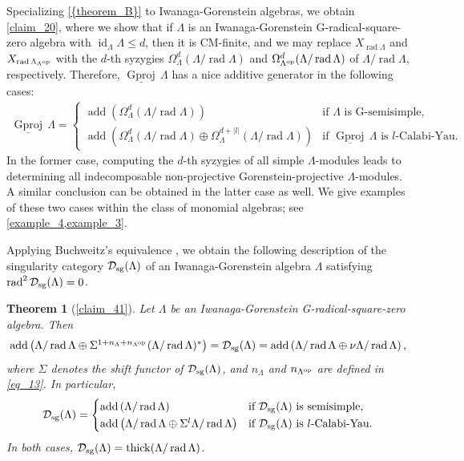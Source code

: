 \documentclass[12pt]{amsart}
\numberwithin{equation}{subsection}
\theoremstyle{plain}
\newtheorem{theorem}{Theorem}[section]
\theoremstyle{definition}
\newcommand{\rad}{\operatorname{rad}}
\newcommand{\add}{\operatorname{add}}
\newcommand{\sGproj}{\underline{\operatorname{Gproj}}\,}
\newcommand{\thick}{\operatorname{thick}}
\newcommand{\injdim}{\operatorname{id}}
\renewcommand{\L}{\Lambda}
\newcommand{\D}{\mathcal{D}}
\newcommand{\op}{{\rm op}}
\begin{document}
Specializing \cref{{theorem_B}} to Iwanaga-Gorenstein algebras, we obtain \cref{claim_20}, where we show that if $\L$ is an Iwanaga-Gorenstein G-radical-square-zero algebra with $\injdim_\L\L\leq d$, then it is CM-finite, and we may replace $X_{\rad\L}$ and $X_{\rad\L_{\L^\op}}$ with the $d$-th syzygies $\Omega_\L^d(\L/\rad\L)$ and $\Omega_{\L^\op}^d(\L/\rad\L)$ of $\L/\rad\L$, respectively.
Therefore, $\sGproj\L$ has a nice additive generator in the following cases:
\begin{align}
    \sGproj\L = 
    \begin{cases}
    \add\left(\Omega_\L^d(\L/\rad\L)\right) &\text{if $\L$ is G-semisimple,}\\[1.5mm]
    \add\left(\Omega_\L^d(\L/\rad\L)\oplus\Omega_\L^{d+|l|}(\L/\rad\L)\right) &\text{if $\sGproj\L$ is $l$-Calabi-Yau.}
    \end{cases}
\end{align}
In the former case, computing the $d$-th syzygies of all simple $\L$-modules leads to determining all indecomposable non-projective Gorenstein-projective $\L$-modules.
A similar conclusion can be obtained in the latter case as well.
We give examples of these two cases within the class of monomial algebras; see \cref{example_4,example_3}. 





Applying Buchweitz's equivalence \cite{Buchweitz_1986}, we obtain the following description of the singularity category $\D_{\rm sg}(\L)$ of an Iwanaga-Gorenstein algebra $\L$ satisfying $\rad^2\D_{\rm sg}(\L)=0$.




\begin{theorem}[{\cref{claim_41}}]\label{theorem_C}
Let $\L$ be an Iwanaga-Gorenstein  G-radical-square-zero algebra.
Then 
\begin{align}
    \textstyle 
    \add\left(\L/\rad\L \oplus \Sigma^{1+n_{\L}+n_{\L^\op}}(\L/\rad\L)^*\right)=\D_{\rm sg}(\L)
    = \add\left(\L/\rad\L \oplus \nu\L/\rad\L\right),
\end{align}
where $\Sigma$ denotes the shift functor of $\D_{\rm sg}(\L)$, and $n_{\L}$ and $n_{\L^\op}$ are defined in \eqref{eq_13}.
In particular, 
\begin{align}
    \textstyle 
    \D_{\rm sg}(\L)=     
    \begin{cases}
    \add\left(\L/\rad\L\right) & \text{if $\D_{\rm sg}(\L)$ is semisimple,} \\[1pt]
    \add\left(\L/\rad\L \oplus \Sigma^l\L/\rad\L\right) & \text{if $\D_{\rm sg}(\L)$ is $l$-Calabi-Yau.}
    \end{cases}
\end{align}
In both cases,  $\D_{\rm sg}(\L) = \thick(\L/\rad\L)$.
\end{theorem}
\end{document}
